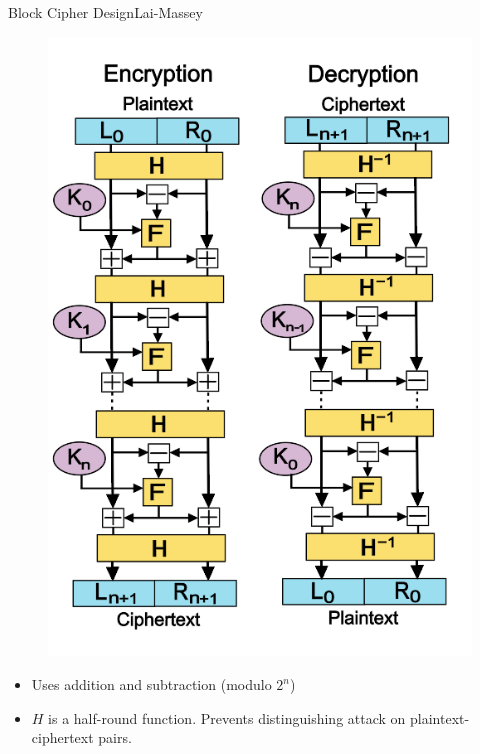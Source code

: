 \documentclass[12pt]{beamer}
\begin{document}
\begin{frame}{Block Cipher Design}{Lai-Massey}
	\centering
	\begin{minipage}{0.45\textwidth}
		\begin{figure}[h!]
			\centering
			\includegraphics[width=\textwidth,height=0.8\textheight,keepaspectratio]{lai-massey}
		\end{figure}
	\end{minipage}
	\begin{minipage}{0.45\textwidth}
		\begin{itemize}
			\item Uses addition and subtraction (modulo $2^n$)
			\item $H$ is a half-round function. Prevents distinguishing attack
				on plaintext-ciphertext pairs.
		\end{itemize}
	\end{minipage}
\end{frame}
\end{document}
